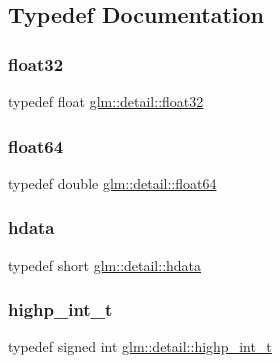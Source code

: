 \subsection{Typedef Documentation}
\mbox{\label{namespaceglm_1_1detail_ad60558c5c304624de0b54c51b5857737}} 
\subsubsection{\texorpdfstring{float32}{float32}}
{\footnotesize\ttfamily typedef float \hyperlink{namespaceglm_1_1detail_ad60558c5c304624de0b54c51b5857737}{glm\+::detail\+::float32}}

\mbox{\label{namespaceglm_1_1detail_a5a0a9a1be3fd5dbe6d47ae45c3022b06}} 
\subsubsection{\texorpdfstring{float64}{float64}}
{\footnotesize\ttfamily typedef double \hyperlink{namespaceglm_1_1detail_a5a0a9a1be3fd5dbe6d47ae45c3022b06}{glm\+::detail\+::float64}}

\mbox{\label{namespaceglm_1_1detail_aa2115f7dd38e14fea7ba9e95104120f3}} 
\subsubsection{\texorpdfstring{hdata}{hdata}}
{\footnotesize\ttfamily typedef short \hyperlink{namespaceglm_1_1detail_aa2115f7dd38e14fea7ba9e95104120f3}{glm\+::detail\+::hdata}}

\mbox{\label{namespaceglm_1_1detail_a74c48e9deafcc33db998a4ee62da8d6e}} 
\subsubsection{\texorpdfstring{highp\+\_\+int\+\_\+t}{highp\_int\_t}}
{\footnotesize\ttfamily typedef signed int \hyperlink{namespaceglm_1_1detail_a74c48e9deafcc33db998a4ee62da8d6e}{glm\+::detail\+::highp\+\_\+int\+\_\+t}}

